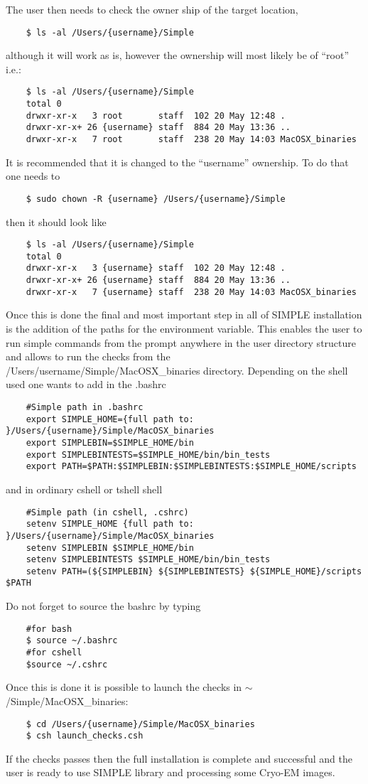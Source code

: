 \documentclass[review]{elsarticle}
\begin{document}
The user then needs to check the owner ship of the target location,
\begin{verbatim}
    $ ls -al /Users/{username}/Simple
\end{verbatim}
although it will work as is, however the ownership will most likely be of
``root'' i.e.:
\begin{verbatim}
    $ ls -al /Users/{username}/Simple
    total 0
    drwxr-xr-x   3 root       staff  102 20 May 12:48 .
    drwxr-xr-x+ 26 {username} staff  884 20 May 13:36 ..
    drwxr-xr-x   7 root       staff  238 20 May 14:03 MacOSX_binaries
\end{verbatim}
It is recommended that it is changed to the ``username''
ownership. To do that one needs to   
\begin{verbatim}
    $ sudo chown -R {username} /Users/{username}/Simple
\end{verbatim}
then it should look like
\begin{verbatim}
    $ ls -al /Users/{username}/Simple
    total 0
    drwxr-xr-x   3 {username} staff  102 20 May 12:48 .
    drwxr-xr-x+ 26 {username} staff  884 20 May 13:36 ..
    drwxr-xr-x   7 {username} staff  238 20 May 14:03 MacOSX_binaries
\end{verbatim}
Once this is done the final and most important step in all of SIMPLE
installation is the addition of the paths for the environment
variable. This enables the user to run simple commands from the
prompt anywhere in the user directory structure and allows to run the
checks from the /Users/{username}/Simple/MacOSX\_binaries
directory. Depending on the shell used one wants to add in the .bashrc
\begin{verbatim}
    #Simple path in .bashrc                                                            
    export SIMPLE_HOME={full path to: }/Users/{username}/Simple/MacOSX_binaries
    export SIMPLEBIN=$SIMPLE_HOME/bin
    export SIMPLEBINTESTS=$SIMPLE_HOME/bin/bin_tests
    export PATH=$PATH:$SIMPLEBIN:$SIMPLEBINTESTS:$SIMPLE_HOME/scripts
\end{verbatim}
and in ordinary cshell or tshell shell
\begin{verbatim}
    #Simple path (in cshell, .cshrc)
    setenv SIMPLE_HOME {full path to: }/Users/{username}/Simple/MacOSX_binaries
    setenv SIMPLEBIN $SIMPLE_HOME/bin
    setenv SIMPLEBINTESTS $SIMPLE_HOME/bin/bin_tests
    setenv PATH=(${SIMPLEBIN} ${SIMPLEBINTESTS} ${SIMPLE_HOME}/scripts $PATH
\end{verbatim}
Do not forget to source the bashrc by typing
\begin{verbatim}
    #for bash
    $ source ~/.bashrc
    #for cshell
    $source ~/.cshrc
\end{verbatim}
Once this is done it is possible to launch the checks in
$\sim$/Simple/MacOSX\_binaries: 
\begin{verbatim}
    $ cd /Users/{username}/Simple/MacOSX_binaries                                         
    $ csh launch_checks.csh
\end{verbatim}
If the checks passes then the full installation is complete and
successful and the user is ready to use SIMPLE library and processing
some Cryo-EM images.
\end{document}
